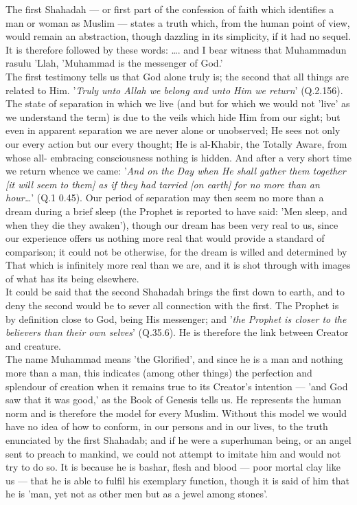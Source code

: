 \documentclass[11pt, b5paper, twoside]{book}
\begin{document}
The first Shahadah --- or first part of the confession of faith which identifies a man or woman as 
Muslim --- states a truth which, from the human point of view, would remain an abstraction, though 
dazzling in its simplicity, if it had no sequel. It is therefore followed by these words: \ldots{}. and I 
bear witness that Muhammadun rasulu 'Llah, 'Muhammad is the messenger of God.' \\

The first testimony tells us that God alone truly is; the second that all things are related to Him. 
'\emph{Truly unto Allah we belong and unto Him we return}' (Q.2.156). The state of separation in which we live (and but for which we would not 'live' as we understand the term) is due to the veils which hide 
Him from our sight; but even in apparent separation we are never alone or unobserved; He sees not 
only our every action but our every thought; He is al-Khabir, the Totally Aware, from whose all-
embracing consciousness nothing is hidden. And after a very short time we return whence we came: '\emph{And on the Day when He shall gather them together [it will seem to them] as if they had tarried [on earth] for no more than an hour\ldots{}}' (Q.1 0.45). Our period of separation may then seem no more than a dream during a brief sleep (the Prophet is reported to have said: 'Men sleep, and when they die they awaken'), though our dream has been very real to us, since our experience offers us nothing more real that would provide a standard of comparison; it could not be otherwise, for the dream is willed and determined by That which is infinitely more real than we are, and it is shot through with images of 
what has its being elsewhere. \\

It could be said that the second Shahadah brings the first down to earth, and to deny the second 
would be to sever all connection with the first. The Prophet is by definition close to God, being His 
messenger; and '\emph{the Prophet is closer to the believers than their own selves}' (Q.35.6). He is 
therefore the link between Creator and creature. \\

The name Muhammad means 'the Glorified', and since he is a man and nothing more than a man, this 
indicates (among other things) the perfection and splendour of creation when it remains true to its 
Creator's intention --- 'and God saw that it was good,' as the Book of Genesis tells us. He represents 
the human norm and is therefore the model for every Muslim. Without this model we would have no idea 
of how to conform, in our persons and in our lives, to the truth enunciated by the first Shahadab; 
and if he were a superhuman being, or an angel sent to preach to mankind, we could not attempt to 
imitate him and would not try to do so. It is because he is bashar, flesh and blood --- poor mortal 
clay like us --- that he is able to fulfil his exemplary function, though it is said of him that he is 
'man, yet not as other men but as a jewel among stones'. \\
\end{document}
